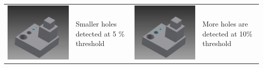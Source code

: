\begin{longtable}{ | C{0.25\textwidth}  L{0.25\textwidth} || C{0.25\textwidth}  L{0.25\textwidth}|}
\includegraphics[scale=0.236]{..//Common/images//defeat3.png} &
Smaller holes detected at 5 \% threshold &
\includegraphics[scale=0.236]{..//Common/images//defeat4.png} &
More holes are detected at 10\%  threshold\\


\end{longtable}
